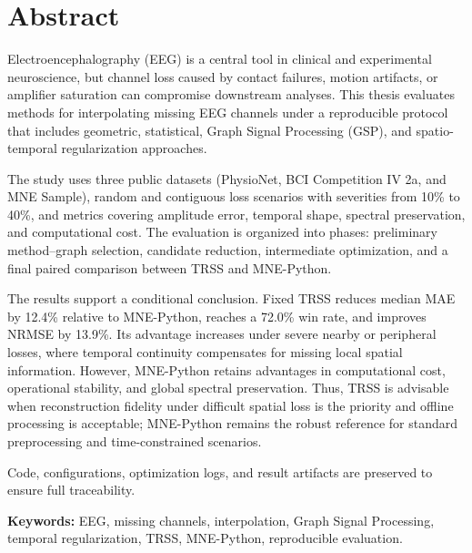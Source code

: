 \chapter*{Abstract}

Electroencephalography (EEG) is a central tool in clinical and experimental neuroscience, but channel loss caused by contact failures, motion artifacts, or amplifier saturation can compromise downstream analyses. This thesis evaluates methods for interpolating missing EEG channels under a reproducible protocol that includes geometric, statistical, Graph Signal Processing (GSP), and spatio-temporal regularization approaches.

The study uses three public datasets (PhysioNet, BCI Competition IV 2a, and MNE Sample), random and contiguous loss scenarios with severities from 10\% to 40\%, and metrics covering amplitude error, temporal shape, spectral preservation, and computational cost. The evaluation is organized into phases: preliminary method--graph selection, candidate reduction, intermediate optimization, and a final paired comparison between TRSS and MNE-Python.

The results support a conditional conclusion. Fixed TRSS reduces median MAE by 12.4\% relative to MNE-Python, reaches a 72.0\% win rate, and improves NRMSE by 13.9\%. Its advantage increases under severe nearby or peripheral losses, where temporal continuity compensates for missing local spatial information. However, MNE-Python retains advantages in computational cost, operational stability, and global spectral preservation. Thus, TRSS is advisable when reconstruction fidelity under difficult spatial loss is the priority and offline processing is acceptable; MNE-Python remains the robust reference for standard preprocessing and time-constrained scenarios.

Code, configurations, optimization logs, and result artifacts are preserved to ensure full traceability.

\vspace{1em}
\noindent\textbf{Keywords:} EEG, missing channels, interpolation, Graph Signal Processing, temporal regularization, TRSS, MNE-Python, reproducible evaluation.